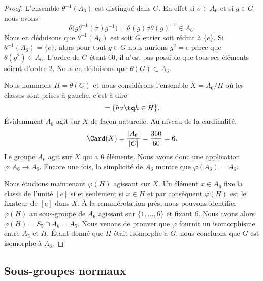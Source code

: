 \begin{proof}
    L'ensemble \( \theta^{-1}(A_6)\) est distingué dans \( G\). En effet si \( \sigma\in A_6\) et si \( g\in G\) nous avons
    \begin{equation}
        \theta\big( g\theta^{-1}(\sigma)g^{-1} \big)=\theta(g)\sigma \theta(g)^{-1}\in A_6.
    \end{equation}
    Nous en déduisons que \( \theta^{-1}(A_6)\) est soit \( G\) entier soit réduit à \( \{ e \}\). Si \( \theta^{-1}(A_6)=\{ e \}\), alors pour tout \( g\in G\) nous aurions \( g^2=e\) parce que \( \theta(g^2)\in A_6\). L'ordre de \( G\) étant \( 60\), il n'est pas possible que tous ses éléments soient d'ordre \( 2\). Nous en déduisons que \( \theta(G)\subset A_6\).

    Nous nommons \( H=\theta(G)\) et nous considérons l'ensemble \( X=A_6/H\) où les classes sont prises à gauche, c'est-à-dire
    \begin{equation}
        [\sigma]=\{ h\sigma\tq h\in H \}.
    \end{equation}
    Évidemment \( A_6\) agit sur \( X\) de façon naturelle. Au niveau de la cardinalité,
    \begin{equation}
        \Card(X)=\frac{ | A_6 | }{ | G | }=\frac{ 360 }{ 60 }=6.
    \end{equation}
    Le groupe \( A_6\) agit sur \( X\) qui a \( 6\) éléments. Nous avons donc une application \( \varphi\colon A_6\to A_6\). Encore une fois, la simplicité de \( A_6\) montre que \( \varphi(A_6)=A_6\).

    Nous étudions maintenant \( \varphi(H)\) agissant sur \( X\). Un élément \( x\in A_6\) fixe la classe de l'unité \( [e]\) si et seulement si \( x\in H\) et par conséquent \( \varphi(H)\) est le fixateur de \( [e]\) dans \( X\). À la renumérotation près, nous pouvons identifier \( \varphi(H)\) au sous-groupe de \( A_6\) agissant sur \( \{ 1,\ldots, 6 \}\) et fixant \( 6\). Nous avons alors \( \varphi(H)=S_5\cap A_6=A_5\). Nous venons de prouver que \( \varphi\) fournit un isomorphisme entre \( A_5\) et \( H\). Étant donné que \( H\) était isomorphe à \( G\), nous concluons que \( G\) est isomorphe à \( A_6\).
\end{proof}

\subsection{Sous-groupes normaux}

